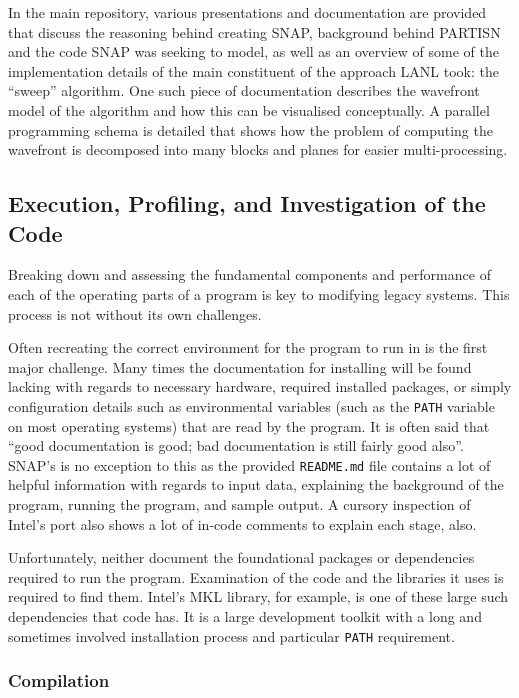 \documentclass[conference]{IEEEtran}
\begin{document}
In the main repository, various presentations and documentation are provided that discuss the reasoning behind creating SNAP, background behind PARTISN and the code SNAP was seeking to model, as well as an overview of some of the implementation details of the main constituent of the approach LANL took: the ``sweep'' algorithm. One such piece of documentation describes the wavefront model of the algorithm and how this can be visualised conceptually. A parallel programming schema is detailed that shows how the problem of computing the wavefront is decomposed into many blocks and planes for easier multi-processing.

\subsection{Execution, Profiling, and Investigation of the Code}

Breaking down and assessing the fundamental components and performance of each of the operating parts of a program is key to modifying legacy systems. This process is not without its own challenges.

Often recreating the correct environment for the program to run in is the first major challenge. Many times the documentation for installing will be found lacking with regards to necessary hardware, required installed packages, or simply configuration details such as environmental variables (such as the \texttt{PATH} variable on most operating systems) that are read by the program. It is often said that ``good documentation is good; bad documentation is still fairly good also''. SNAP's is no exception to this as the provided \texttt{README.md} file contains a lot of helpful information with regards to input data, explaining the background of the program, running the program, and sample output. A cursory inspection of Intel's port also shows a lot of in-code comments to explain each stage, also.

Unfortunately, neither document the foundational packages or dependencies required to run the program. Examination of the code and the libraries it uses is required to find them. Intel's MKL library, for example, is one of these large such dependencies that code has. It is a large development toolkit with a long and sometimes involved installation process and particular \texttt{PATH} requirement.

\subsubsection{Compilation}
\label{subsubsec:inv_compilation}
\end{document}
